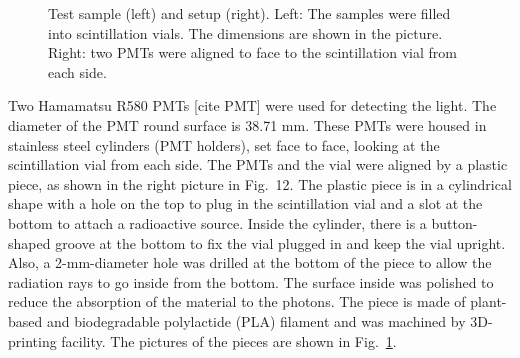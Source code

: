 \begin{figure}[htbp]
	\caption{Test sample (left) and setup (right). Left: The samples were filled into scintillation vials. The dimensions are shown in the picture. Right: two PMTs were aligned to face to the scintillation vial from each side.}
	\label{scintVial}
\end{figure}

Two Hamamatsu R580 PMTs [cite PMT] were used for detecting the light. The diameter of the PMT round surface is 38.71 mm. These PMTs were housed in stainless steel cylinders (PMT holders), set face to face, looking at the scintillation vial from each side. The PMTs and the vial were aligned by a plastic piece, as shown in the right picture in Fig.~12.  The plastic piece is in a cylindrical shape with a hole on the top to plug in the scintillation vial and a slot at the bottom to attach a radioactive source. Inside the cylinder, there is a button-shaped groove at the bottom to fix the vial plugged in and keep the vial upright. Also, a 2-mm-diameter hole was drilled at the bottom of the piece to allow the radiation rays to go inside from the bottom. The surface inside was polished to reduce the absorption of the material to the photons. The piece is made of plant-based and biodegradable polylactide (PLA) filament and was machined by 3D-printing facility. The pictures of the pieces are shown in Fig.~\ref{scintVial}.

